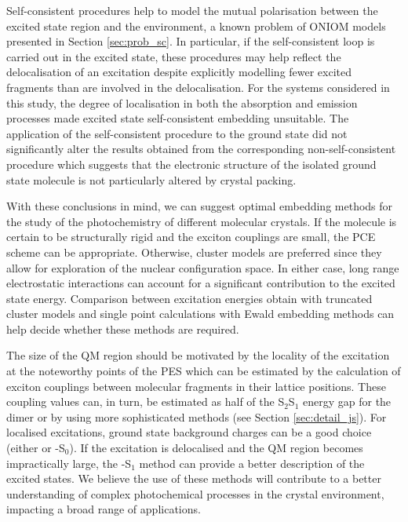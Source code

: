  Self-consistent procedures help to model the mutual polarisation between the excited state region and the environment, a known problem of ONIOM models presented in Section \ref{sec:prob_sc}. In particular, if the self-consistent loop is carried out in the excited state, these procedures may help reflect the delocalisation of an excitation despite explicitly modelling fewer excited fragments than are involved in the delocalisation. For the systems considered in this study, the degree of localisation in both the absorption and emission processes made excited state self-consistent embedding unsuitable. The application of the self-consistent procedure to the ground state did not significantly alter the results obtained from the corresponding non-self-consistent procedure which suggests that the electronic structure of the isolated ground state molecule is not particularly altered by crystal packing. 
 
 With these conclusions in mind, we can suggest optimal embedding methods for the study of the photochemistry of different molecular crystals. If the molecule is certain to be structurally rigid and the exciton couplings are small, the PCE scheme can be appropriate. Otherwise, cluster models are preferred since they allow for exploration of the nuclear configuration space. In either case, long range electrostatic interactions can account for a significant contribution to the excited state energy. Comparison between excitation energies obtain with truncated cluster models and single point calculations with Ewald embedding methods can help decide whether these methods are required.  
 
 The size of the QM region should be motivated by the locality of the excitation at the noteworthy points of the PES which can be estimated by the calculation of exciton couplings between molecular fragments in their lattice positions. These coupling values can, in turn, be estimated as half of the S$_2$\textendash{}S$_1$ energy gap for the dimer\cite{Spano2016} or by using more sophisticated methods (see Section \ref{sec:detail_js}). For localised excitations, ground state background charges can be a good choice (either \EEC{} or \SCEEC{}-S$_0$). If the excitation is delocalised and the QM region becomes impractically large, the \SCEEC{}-S$_1$ method can provide a better description of the excited states. We believe the use of these methods will contribute to a better understanding of complex photochemical processes in the crystal environment, impacting a broad range of applications. 
